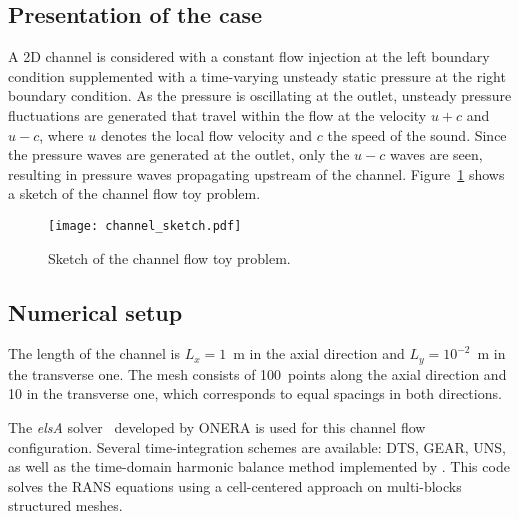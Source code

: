 \subsection{Presentation of the case}
\label{sub:presentation_of_the_case}

A 2D channel is considered  with a constant flow injection
at the left boundary condition
supplemented with a time-varying unsteady static pressure 
at the right boundary condition.
As the pressure is oscillating at the outlet, unsteady pressure
fluctuations are generated that travel within the flow at the velocity 
$u + c$ and $u - c$, where $u$ denotes 
the local flow velocity and $c$ the speed of the sound.
Since the pressure waves are generated at the outlet, only
the $u-c$ waves are seen, resulting in pressure waves propagating
upstream of the channel. Figure~\ref{fig:canal_principle} shows a sketch
of the channel flow toy problem.
\begin{figure}[htb]
  \centering
  \texttt{[image: channel\_sketch.pdf]}
  \caption{Sketch of the channel flow toy problem.}
  \label{fig:canal_principle}
\end{figure}

\subsection{Numerical setup}

The length of the channel is $L_x = 1$~m in the axial
direction and $L_y = 10^{-2}$~m in the transverse one.
The mesh consists of 100~points along the axial direction and 10 in the
transverse one, which corresponds to equal spacings in both
directions.

The \emph{elsA} solver~\cite{Cambier2013} developed by ONERA
is used for this channel flow configuration. 
Several time-integration schemes
are available: DTS, GEAR, UNS, 
as well as the time-domain harmonic 
balance method implemented by \citet{JSicot2008}. 
This code solves the RANS equations using a cell-centered
approach on multi-blocks structured meshes.


